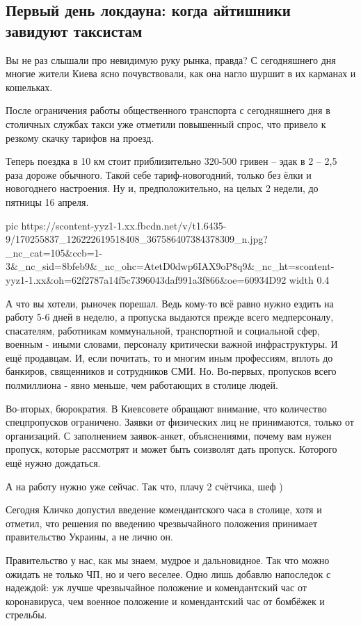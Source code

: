  
 
 
 
 

\subsection{Первый день локдауна: когда айтишники завидуют таксистам }

Вы не раз слышали про невидимую руку рынка, правда? С сегодняшнего дня многие
жители Киева ясно почувствовали, как она нагло шуршит в их карманах и
кошельках.   

После ограничения работы общественного транспорта с сегодняшнего дня в
столичных службах такси уже отметили повышенный спрос, что привело к резкому
скачку тарифов на проезд. 

Теперь поездка в 10 км стоит приблизительно 320-500 гривен – эдак в 2 – 2,5
раза дороже обычного. Такой себе тариф-новогодний, только без ёлки и
новогоднего настроения. Ну и, предположительно, на целых 2 недели, до пятницы
16 апреля.


\ifcmt
  pic https://scontent-yyz1-1.xx.fbcdn.net/v/t1.6435-9/170255837_126222619518408_367586407384378309_n.jpg?_nc_cat=105&ccb=1-3&_nc_sid=8bfeb9&_nc_ohc=AtetD0dwp6IAX9oP8q9&_nc_ht=scontent-yyz1-1.xx&oh=62f2787a14f5c7396043daf991a3f866&oe=60934D92
  width 0.4
\fi


А что вы хотели, рыночек порешал. Ведь кому-то всё равно нужно ездить на работу
5-6 дней в неделю, а пропуска выдаются прежде всего медперсоналу, спасателям,
работникам коммунальной, транспортной и социальной сфер, военным - иными
словами, персоналу критически важной инфраструктуры. И ещё продавцам. И, если
почитать, то и многим иным профессиям, вплоть до банкиров, священников и
сотрудников СМИ. Но. Во-первых, пропусков всего полмиллиона -  явно меньше, чем
работающих в столице людей. 

Во-вторых, бюрократия. В Киевсовете обращают внимание, что количество
спецпропусков ограничено. Заявки от физических лиц не принимаются, только от
организаций. С заполнением заявок-анкет, объяснениями, почему вам нужен
пропуск, которые рассмотрят и может быть соизволят дать пропуск. Которого ещё
нужно дождаться. 

А на работу нужно уже сейчас. Так что, плачу 2 счётчика, шеф ) 

Сегодня Кличко допустил введение комендантского часа в столице, хотя и отметил,
что решения по введению чрезвычайного положения принимает правительство
Украины, а не лично он.

Правительство у нас, как мы знаем, мудрое и дальновидное. Так что можно ожидать
не только ЧП, но и чего веселее. Одно лишь добавлю напоследок с надеждой: уж
лучше чрезвычайное положение и комендантский час от коронавируса, чем военное
положение и комендантский час от бомбёжек и стрельбы.
